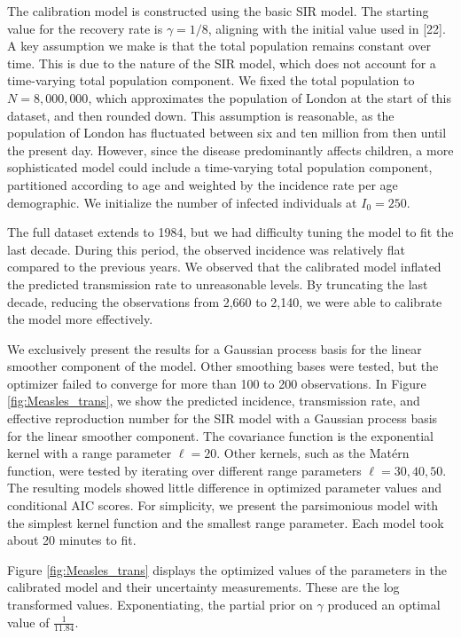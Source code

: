 \documentclass[
11pt, %
oneside, %
english, %
singlespacing, %
]{macthesis} %
\begin{document}
The calibration model is constructed using the basic SIR model. The starting value for the recovery rate is \(\gamma = 1/8\), aligning with the initial value used in {[}22{]}. A key assumption we make is that the total population remains constant over time. This is due to the nature of the SIR model, which does not account for a time-varying total population component. We fixed the total population to \(N = 8,000,000\), which approximates the population of London at the start of this dataset, and then rounded down. This assumption is reasonable, as the population of London has fluctuated between six and ten million from then until the present day. However, since the disease predominantly affects children, a more sophisticated model could include a time-varying total population component, partitioned according to age and weighted by the incidence rate per age demographic. We initialize the number of infected individuals at \(I_0 = 250\).

The full dataset extends to 1984, but we had difficulty tuning the model to fit the last decade. During this period, the observed incidence was relatively flat compared to the previous years. We observed that the calibrated model inflated the predicted transmission rate to unreasonable levels. By truncating the last decade, reducing the observations from 2,660 to 2,140, we were able to calibrate the model more effectively.

We exclusively present the results for a Gaussian process basis for the linear smoother component of the model. Other smoothing bases were tested, but the optimizer failed to converge for more than 100 to 200 observations. In Figure \ref{fig:Measles_trans}, we show the predicted incidence, transmission rate, and effective reproduction number for the SIR model with a Gaussian process basis for the linear smoother component. The covariance function is the exponential kernel with a range parameter \(\ell = 20\). Other kernels, such as the Matérn function, were tested by iterating over different range parameters \(\ell = 30, 40, 50\). The resulting models showed little difference in optimized parameter values and conditional AIC scores. For simplicity, we present the parsimonious model with the simplest kernel function and the smallest range parameter. Each model took about 20 minutes to fit.

Figure \ref{fig:Measles_trans} displays the optimized values of the parameters in the calibrated model and their uncertainty measurements. These are the log transformed values. Exponentiating, the partial prior on \(\gamma\) produced an optimal value of \(\frac{1}{11.84}\).
\end{document}
